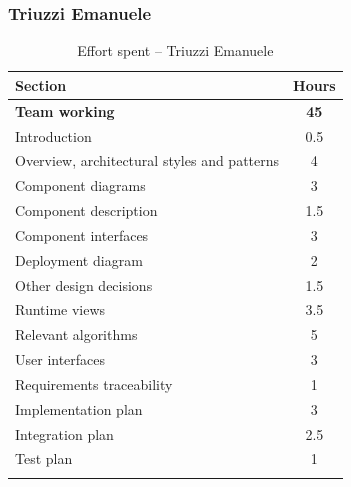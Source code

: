 \documentclass[a4paper,oneside,11pt]{book}
\begin{document}
    \subsubsection{Triuzzi Emanuele}
    \begin{longtable}[c]{|H{.55\textwidth}|c|}
        \hline
        \textbf{Section} & {\bfseries{Hours}} \\ \hline
        \textbf{Team working} & \textbf{45} \\ \hline
        Introduction                                  & 0.5 \\ \hline
        Overview, architectural styles and patterns   & 4 \\ \hline
        Component diagrams                            & 3 \\ \hline
        Component description                         & 1.5 \\ \hline
        Component interfaces                          & 3 \\ \hline
        Deployment diagram                            & 2 \\ \hline
        Other design decisions                        & 1.5 \\ \hline
        Runtime views                                 & 3.5 \\ \hline
        Relevant algorithms                           & 5 \\ \hline
        User interfaces                               & 3 \\ \hline
        Requirements traceability                     & 1 \\ \hline
        Implementation plan                           & 3 \\ \hline
        Integration plan                              & 2.5 \\ \hline 
        Test plan                                     & 1 \\ \hline
        \caption{Effort spent -- Triuzzi Emanuele}
        \label{table:effort_triuzzi}
    \end{longtable}
    
\end{document}
